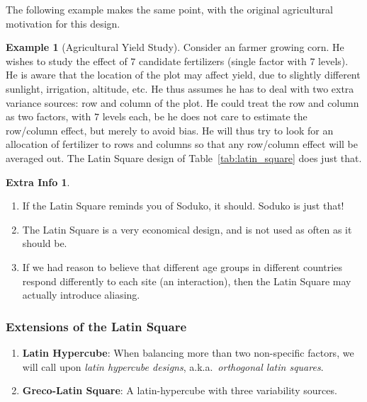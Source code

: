 \documentclass[12pt,a4paper]{report}
\theoremstyle{plain}
\theoremstyle{definition}
\newtheorem{extra}{Extra Info}
\newtheorem{example}{Example}
\newcommand{\aka}{{a.k.a.\ }}
\begin{document}
The following example makes the same point, with the original agricultural motivation for this design.
\begin{example}[Agricultural Yield Study]
\label{eg:latin_square}
Consider an farmer growing corn.
He wishes to study the effect of $7$ candidate fertilizers (single factor with $7$ levels).
He is aware that the location of the plot may affect yield, due to slightly different sunlight, irrigation, altitude, etc.
He thus assumes he has to deal with two extra variance sources: row and column of the plot. 
He could treat the row and column as two factors, with $7$ levels each, be he does not care to estimate the row/column effect, but merely to avoid bias.
He will thus try to look for an allocation of fertilizer to rows and columns so that any row/column effect will be averaged out.
The Latin Square design of Table~\ref{tab:latin_square} does just that.
\end{example}


\begin{extra}\noindent
\begin{enumerate}
\item If the Latin Square reminds you of Soduko, it should. Soduko is just that!
\item The Latin Square is a very economical design, and is not used as often as it should be.
\item If we had reason to believe that different age groups in different countries respond differently to each site (an interaction), then the Latin Square may actually introduce aliasing. 
\end{enumerate}
\end{extra}



\subsubsection{Extensions of the Latin Square}
\begin{enumerate}
\item \textbf{Latin Hypercube}: When balancing more than two non-specific factors, we will call upon \emph{latin hypercube designs}, \aka \emph{orthogonal latin squares}. 
\item \textbf{Greco-Latin Square}: A latin-hypercube with three variability sources. 
\end{enumerate}
\end{document}

